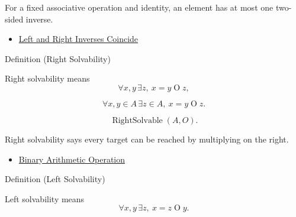 \begin{remark*}[Interpretation]
For a fixed associative operation and identity, an element has at most one
two-sided inverse.
\end{remark*}

\begin{dependencies}
\begin{itemize}
  \item \hyperref[lem:left-right-inverses-coincide]{Left and Right Inverses Coincide}
\end{itemize}
\end{dependencies}

\begin{definitionbox}{Definition (Right Solvability)}
\begin{definition}
\label{def:right-solvability}
Right solvability means
\[
\forall x,y\,\exists z,\ x=y\mathbin{O}z,
\]
\end{definition}
\end{definitionbox}

\begin{remark*}
\[
\forall x,y\in A\,\exists z\in A,\ x=y\mathbin{O}z.
\]
\end{remark*}

\begin{remark*}
\[
\operatorname{RightSolvable}(A,O).
\]
\end{remark*}

\begin{remark*}[Interpretation]
Right solvability says every target can be reached by multiplying on the right.
\end{remark*}

\begin{dependencies}
\begin{itemize}
  \item \hyperref[def:binary-arithmetic-operation]{Binary Arithmetic Operation}
\end{itemize}
\end{dependencies}

\begin{definitionbox}{Definition (Left Solvability)}
\begin{definition}
\label{def:left-solvability}
Left solvability means
\[
\forall x,y\,\exists z,\ x=z\mathbin{O}y.
\]
\end{definition}
\end{definitionbox}

